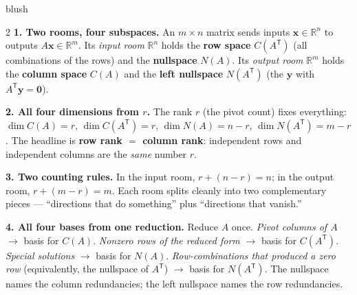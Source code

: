 \documentclass[10pt]{article}
\newcommand{\xx}{\mathbf{x}}
\newcommand{\yy}{\mathbf{y}}
\newcommand{\zero}{\mathbf{0}}
\newcommand{\T}{\mathsf{T}}
\begin{document}
\begin{skillbox}[Lesson]{blush}
\begin{multicols}{2}
\textbf{1. Two rooms, four subspaces.} An $m\times n$ matrix sends inputs $\xx\in\mathbb{R}^n$ to outputs
$A\xx\in\mathbb{R}^m$. Its \emph{input room} $\mathbb{R}^n$ holds the \textbf{row space} $C(A^{\T})$ (all
combinations of the rows) and the \textbf{nullspace} $N(A)$. Its \emph{output room} $\mathbb{R}^m$ holds the
\textbf{column space} $C(A)$ and the \textbf{left nullspace} $N(A^{\T})$ (the $\yy$ with $A^{\T}\yy=\zero$).

\textbf{2. All four dimensions from $r$.} The rank $r$ (the pivot count) fixes everything:
$\dim C(A)=r$, $\dim C(A^{\T})=r$, $\dim N(A)=n-r$, $\dim N(A^{\T})=m-r$. The headline is \textbf{row rank
$=$ column rank}: independent rows and independent columns are the \emph{same} number $r$.

\columnbreak

\textbf{3. Two counting rules.} In the input room, $r+(n-r)=n$; in the output room, $r+(m-r)=m$. Each room
splits cleanly into two complementary pieces --- ``directions that do something'' plus ``directions that
vanish.''

\textbf{4. All four bases from one reduction.} Reduce $A$ once. \emph{Pivot columns of $A$} $\to$ basis for
$C(A)$. \emph{Nonzero rows of the reduced form} $\to$ basis for $C(A^{\T})$. \emph{Special solutions} $\to$
basis for $N(A)$. \emph{Row-combinations that produced a zero row} (equivalently, the nullspace of
$A^{\T}$) $\to$ basis for $N(A^{\T})$. The nullspace names the column redundancies; the left nullspace names
the row redundancies.
\end{multicols}
\end{skillbox}
\end{document}
